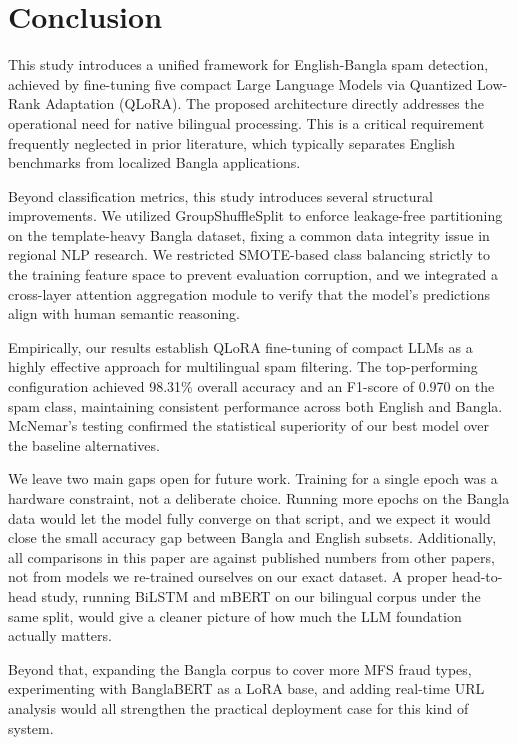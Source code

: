 \documentclass[journal]{IEEEtran}
\begin{document}
\balance
\section{Conclusion}

This study introduces a unified framework for English-Bangla spam detection, achieved by fine-tuning five compact Large Language Models via Quantized Low-Rank Adaptation (QLoRA). The proposed architecture directly addresses the operational need for native bilingual processing. This is a critical requirement frequently neglected in prior literature, which typically separates English benchmarks from localized Bangla applications.

Beyond classification metrics, this study introduces several structural improvements. We utilized GroupShuffleSplit to enforce leakage-free partitioning on the template-heavy Bangla dataset, fixing a common data integrity issue in regional NLP research. We restricted SMOTE-based class balancing strictly to the training feature space to prevent evaluation corruption, and we integrated a cross-layer attention aggregation module to verify that the model's predictions align with human semantic reasoning.

Empirically, our results establish QLoRA fine-tuning of compact LLMs as a highly effective approach for multilingual spam filtering. The top-performing configuration achieved 98.31\% overall accuracy and an F1-score of 0.970 on the spam class, maintaining consistent performance across both English and Bangla. McNemar's testing confirmed the statistical superiority of our best model over the baseline alternatives.

We leave two main gaps open for future work. Training for a single epoch was a hardware constraint, not a deliberate choice. Running more epochs on the Bangla data would let the model fully converge on that script, and we expect it would close the small accuracy gap between Bangla and English subsets. Additionally, all comparisons in this paper are against published numbers from other papers, not from models we re-trained ourselves on our exact dataset. A proper head-to-head study, running BiLSTM and mBERT on our bilingual corpus under the same split, would give a cleaner picture of how much the LLM foundation actually matters.

Beyond that, expanding the Bangla corpus to cover more MFS fraud types, experimenting with BanglaBERT as a LoRA base, and adding real-time URL analysis would all strengthen the practical deployment case for this kind of system.



\end{document}
